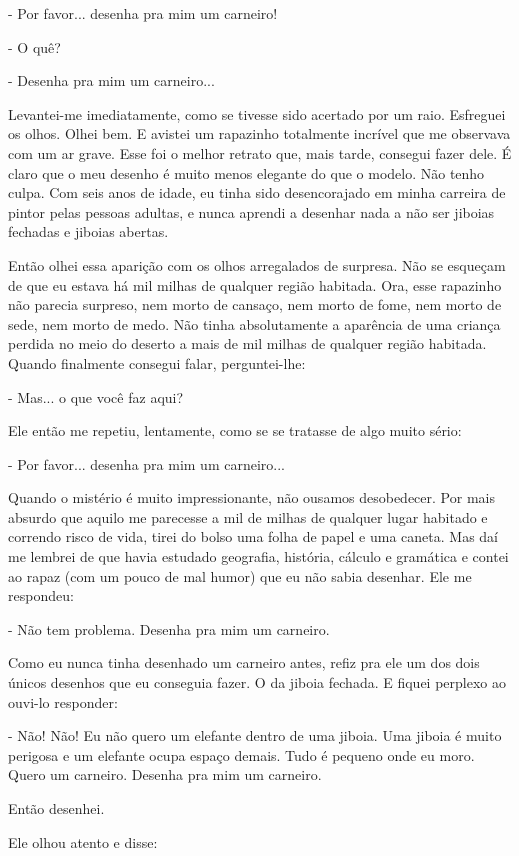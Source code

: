 \begin{Parallel}[p]{}{}
{- Por favor... desenha pra mim um carneiro!

- O quê?

- Desenha pra mim um carneiro...

Levantei-me imediatamente, como se tivesse sido acertado por um raio.
Esfreguei os olhos. Olhei bem. E avistei um rapazinho totalmente
incrível que me observava com um ar grave. Esse foi o melhor retrato
que, mais tarde, consegui fazer dele. É claro que o meu desenho é muito
menos elegante do que o modelo. Não tenho culpa. Com seis anos de idade,
eu tinha sido desencorajado em minha carreira de pintor pelas pessoas
adultas, e nunca aprendi a desenhar nada a não ser jiboias fechadas e
jiboias abertas.

Então olhei essa aparição com os olhos arregalados de surpresa. Não se
esqueçam de que eu estava há mil milhas de qualquer região habitada.
Ora, esse rapazinho não parecia surpreso, nem morto de cansaço, nem
morto de fome, nem morto de sede, nem morto de medo. Não tinha
absolutamente a aparência de uma criança perdida no meio do deserto a
mais de mil milhas de qualquer região habitada. Quando finalmente
consegui falar, perguntei-lhe:

- Mas... o que você faz aqui?

Ele então me repetiu, lentamente, como se se tratasse de algo muito
sério:

- Por favor... desenha pra mim um carneiro...

Quando o mistério é muito impressionante, não ousamos desobedecer. Por
mais absurdo que aquilo me parecesse a mil de milhas de qualquer lugar
habitado e correndo risco de vida, tirei do bolso uma folha de papel e
uma caneta. Mas daí me lembrei de que havia estudado geografia,
história, cálculo e gramática e contei ao rapaz (com um pouco de mal
humor) que eu não sabia desenhar. Ele me respondeu:

- Não tem problema. Desenha pra mim um carneiro.

Como eu nunca tinha desenhado um carneiro antes, refiz pra ele um dos
dois únicos desenhos que eu conseguia fazer. O da jiboia fechada. E
fiquei perplexo ao ouvi-lo responder:

- Não! Não! Eu não quero um elefante dentro de uma jiboia. Uma jiboia é
muito perigosa e um elefante ocupa espaço demais. Tudo é pequeno onde eu
moro. Quero um carneiro. Desenha pra mim um carneiro.

Então desenhei.

Ele olhou atento e disse:

}
\end{Parallel}

